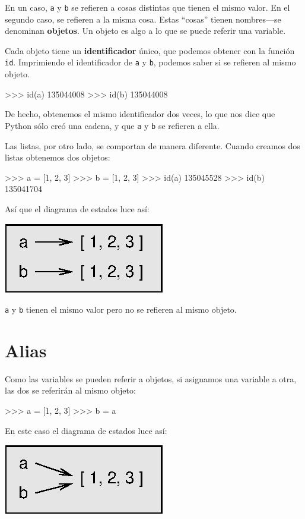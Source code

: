 En un caso, \texttt{a} y \texttt{b} se refieren a cosas distintas
que tienen el mismo valor. En el segundo caso, se refieren a la misma
cosa. Estas ``cosas'' tienen nombres—se denominan \textbf{objetos}.
Un objeto es algo a lo que se puede referir una variable.

Cada objeto tiene un \textbf{identificador} único, que podemos obtener
con la función \texttt{id}. Imprimiendo el identificador de \texttt{a}
y \texttt{b}, podemos saber si se refieren al mismo objeto.
\begin{pyconcode}
>>> id(a)
135044008
>>> id(b)
135044008
\end{pyconcode}

De hecho, obtenemos el mismo identificador dos veces, lo que nos dice
que Python sólo creó una cadena, y que \texttt{a} y \texttt{b} se
refieren a ella.

Las listas, por otro lado, se comportan de manera diferente. Cuando
creamos dos listas obtenemos dos objetos:
\begin{pyconcode}
>>> a = [1, 2, 3]
>>> b = [1, 2, 3]
>>> id(a)
135045528
>>> id(b)
135041704
\end{pyconcode}

Así que el diagrama de estados luce así:

\beforefig \centerline{\includegraphics{illustrations/list2}}
\afterfig

\texttt{a} y \texttt{b} tienen el mismo valor pero no se refieren
al mismo objeto.

\section{Alias}

 

Como las variables se pueden referir a objetos, si asignamos una variable
a otra, las dos se referirán al mismo objeto:
\begin{pyconcode}
>>> a = [1, 2, 3]
>>> b = a
\end{pyconcode}

En este caso el diagrama de estados luce así:

\beforefig \centerline{\includegraphics{illustrations/list3}}
\afterfig

